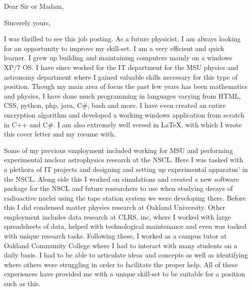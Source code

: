 \documentclass[11pt,a4paper,sans]{moderncv} %
\begin{document}
\makecvtitle 



\date{\today} %
\opening{Dear Sir or Madam,} %

\closing{Sincerely yours,} %

\makelettertitle %

\hspace{1cm} I was thrilled to see this job posting. As a future physicist, I am always looking for an opportunity to improve my skill-set. I am a very efficient and quick learner. I grew up building and maintaining computers mainly on a windows XP/7 OS. I have since worked for the IT department for the MSU physics and astronomy department where I gained valuable skills necessary for this type of position. Though my main area of focus the past few years has been mathematics and physics, I have done much programming in languages varying from HTML, CSS, python, php, java, C\#, bash and more. I have even created an entire encryption algorithm and developed a working windows application from scratch in C++ and C\#. I am also extremely well versed in \LaTeX, with which I wrote this cover letter and my resume with.

\hspace{1cm} Some of my previous employment included working for MSU and performing experimental nuclear astrophysics research at the NSCL. Here I was tasked with a plethora of IT projects and designing and setting up experimental apparatus' in the NSCL. Along side this I worked on simulations and created a new software package for the NSCL and future researchers to use when studying decays of radioactive nuclei using the tape station system we were developing there. Before this I did condensed matter physics research at Oakland University. Other employment includes data research at CLRS, inc, where I worked with large spreadsheets of data, helped with technological maintenance and even was tasked with unique research tasks. Following these, I worked as a campus tutor at Oakland Community College where I had to interact with many students on a daily basis. I had to be able to articulate ideas and concepts as well as identifying where others were struggling in order to facilitate the proper help. All of these experiences have provided me with a unique skill-set to be suitable for a position such as this.
\end{document}
